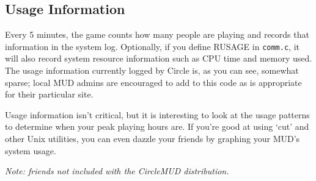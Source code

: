 \documentclass[11pt]{article}
\begin{document}
\subsection{Usage Information}
Every 5 minutes, the game counts how many people are playing and records that information in the system log.  Optionally, if you define RUSAGE in \texttt{comm.c}, it will also record system resource information such as CPU time and memory used.  The usage information currently logged by Circle is, as you can see, somewhat sparse; local MUD admins are encouraged to add
to this code as is appropriate for their particular site.
\par
Usage information isn't critical, but it is interesting to look at the usage patterns to determine when your peak playing hours are.  If you're good at using `cut' and other Unix utilities, you can even dazzle your friends by graphing your MUD's system usage.
\par
{\it Note: friends not included with the CircleMUD distribution.}
\end{document}
